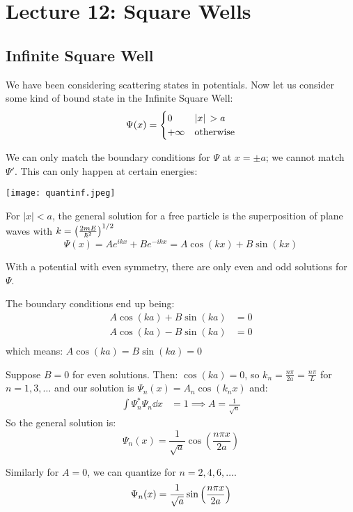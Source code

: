 \section{Lecture 12: Square Wells}

\subsection{Infinite Square Well}
We have been considering scattering states in potentials. Now let us consider some kind of bound state
in the Infinite Square Well:
\begin{align*}
    \Psi(x) = \begin{cases}
        0 & \abs*{x} >a \\
        +\infty & \text{otherwise}
    \end{cases}
\end{align*}

We can only match the boundary conditions for $\Psi$ at $x = \pm a$;
we cannot match $\Psi'$. This can only happen at certain energies:

\texttt{[image: quantinf.jpeg]}

For $|x| < a$, the general solution for a free particle is the superposition of
plane waves with $k = \qty(\frac{2mE}{\hbar^2})^{1/2}$
\[ \Psi(x) = Ae^{ikx} + Be^{-ikx}  = A \cos(kx) + B \sin(kx) \]
\begin{theorem}
With a potential with even symmetry, there are only even and odd solutions for $\Psi$.
\end{theorem}

The boundary conditions end up being:
\begin{align*}
    A \cos(ka) + B \sin(ka) &= 0 \\
    A \cos(ka) - B \sin(ka) &= 0 \\
\end{align*}
which means: $A \cos(ka) = B \sin(ka) = 0$

Suppose $B = 0$ for even solutions. Then: $\cos(ka) = 0$, so $k_n = \frac{n\pi}{2a} = \frac{n\pi}{L}$ for $n = 1, 3, \dots$
and our solution is $\Psi_n(x) = A_n \cos(k_n x)$ and:
\begin{align*}
    \int \Psi_n^* \Psi_n \dd{x} &= 1 \implies A = \frac{1}{\sqrt{a}}
\end{align*}
So the general solution is:
\[ \Psi_n(x) = \frac{1}{\sqrt{a}} \cos(\frac{n\pi x}{2a}) \]

Similarly for $A = 0$, we can quantize for $n = 2, 4, 6, \dots$.
\[ \Psi_n(x) = \frac{1}{\sqrt{a}} \sin\qty(\frac{n\pi x}{2a}) \]

